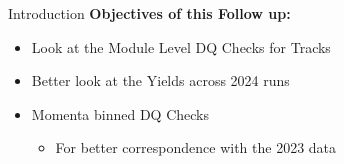 \begin{frame}{Introduction}
    \textbf{Objectives of this Follow up:}
    \begin{itemize}
        \item Look at the Module Level DQ Checks for Tracks
        \item Better look at the Yields across 2024 runs
        \item Momenta binned DQ Checks 
        \begin{itemize}
            \item For better correspondence with the 2023 data
        \end{itemize}
    \end{itemize}
\end{frame}